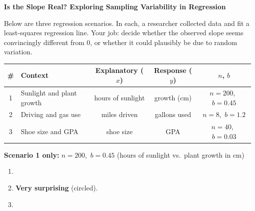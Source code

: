 \documentclass[10pt]{article}
\begin{document}
\namepartnerperiod

\vspace{0.1in}
\textbf{Is the Slope Real? Exploring Sampling Variability in Regression}

\vspace{0.05in}
Below are three regression scenarios. In each, a researcher collected data and fit a
least-squares regression line. Your job: decide whether the observed slope seems
convincingly different from 0, or whether it could plausibly be due to random variation.

\vspace{0.1in}
\begin{center}
\renewcommand{\arraystretch}{1.4}
\begin{tabular}{clccc}
    \textbf{\#} & \textbf{Context} & \textbf{Explanatory ($x$)} & \textbf{Response ($y$)} & \textbf{$n$, $b$} \\
    \hline
    1 & Sunlight and plant growth & hours of sunlight & growth (cm) & $n=200$,\ $b=0.45$ \\
    2 & Driving and gas use       & miles driven      & gallons used & $n=8$,\ $b=1.2$ \\
    3 & Shoe size and GPA         & shoe size         & GPA & $n=40$,\ $b=0.03$ \\
\end{tabular}
\end{center}

\vspace{0.15in}

\begin{tcolorbox}[colback=white, colframe=black!40,
    title=\textbf{Tier R --- Remediate (Key)},
    fonttitle=\bfseries, arc=2mm, left=3mm, right=3mm, top=2mm, bottom=2mm]

\textbf{Scenario 1 only:} $n = 200$,\ $b = 0.45$ (hours of sunlight vs.\ plant growth in cm)

\begin{enumerate}[label=\alph*.]

  \item {}

        \vspace{0.05in}

  \item \textbf{Very surprising} (circled). 

        \vspace{0.05in}

  \item {}

\end{enumerate}
\end{tcolorbox}
\end{document}
